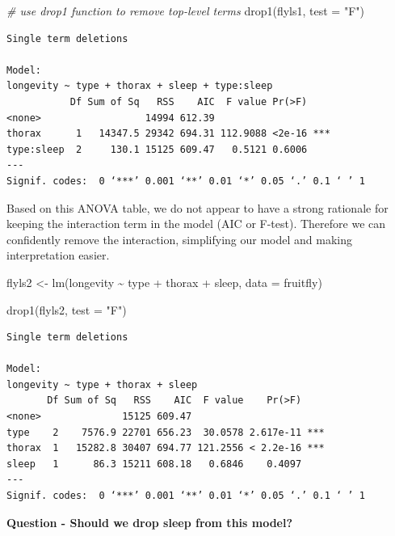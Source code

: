 \documentclass[
]{book}
\newenvironment{Shaded}{\begin{snugshade}}{\end{snugshade}}
\newcommand{\AttributeTok}[1]{\textcolor[rgb]{0.77,0.63,0.00}{#1}}
\newcommand{\CommentTok}[1]{\textcolor[rgb]{0.56,0.35,0.01}{\textit{#1}}}
\newcommand{\FunctionTok}[1]{\textcolor[rgb]{0.00,0.00,0.00}{#1}}
\newcommand{\NormalTok}[1]{#1}
\newcommand{\OtherTok}[1]{\textcolor[rgb]{0.56,0.35,0.01}{#1}}
\newcommand{\SpecialCharTok}[1]{\textcolor[rgb]{0.00,0.00,0.00}{#1}}
\newcommand{\StringTok}[1]{\textcolor[rgb]{0.31,0.60,0.02}{#1}}
\begin{document}
\begin{Shaded}
\begin{Highlighting}[]
\CommentTok{\# use drop1 function to remove top{-}level terms}
\FunctionTok{drop1}\NormalTok{(flyls1, }\AttributeTok{test =} \StringTok{"F"}\NormalTok{)}
\end{Highlighting}
\end{Shaded}

\begin{verbatim}
Single term deletions

Model:
longevity ~ type + thorax + sleep + type:sleep
           Df Sum of Sq   RSS    AIC  F value Pr(>F)    
<none>                  14994 612.39                    
thorax      1   14347.5 29342 694.31 112.9088 <2e-16 ***
type:sleep  2     130.1 15125 609.47   0.5121 0.6006    
---
Signif. codes:  0 ‘***’ 0.001 ‘**’ 0.01 ‘*’ 0.05 ‘.’ 0.1 ‘ ’ 1
\end{verbatim}

Based on this ANOVA table, we do not appear to have a strong rationale for keeping the interaction term in the model (AIC or F-test). Therefore we can confidently remove the interaction, simplifying our model and making interpretation easier.

\begin{Shaded}
\begin{Highlighting}[]
\NormalTok{flyls2 }\OtherTok{\textless{}{-}} \FunctionTok{lm}\NormalTok{(longevity }\SpecialCharTok{\textasciitilde{}}\NormalTok{ type }\SpecialCharTok{+}\NormalTok{ thorax }\SpecialCharTok{+}\NormalTok{ sleep, }\AttributeTok{data =}\NormalTok{ fruitfly)}

\FunctionTok{drop1}\NormalTok{(flyls2, }\AttributeTok{test =} \StringTok{"F"}\NormalTok{)}
\end{Highlighting}
\end{Shaded}

\begin{verbatim}
Single term deletions

Model:
longevity ~ type + thorax + sleep
       Df Sum of Sq   RSS    AIC  F value    Pr(>F)    
<none>              15125 609.47                       
type    2    7576.9 22701 656.23  30.0578 2.617e-11 ***
thorax  1   15282.8 30407 694.77 121.2556 < 2.2e-16 ***
sleep   1      86.3 15211 608.18   0.6846    0.4097    
---
Signif. codes:  0 ‘***’ 0.001 ‘**’ 0.01 ‘*’ 0.05 ‘.’ 0.1 ‘ ’ 1
\end{verbatim}

\textbf{Question - Should we drop sleep from this model?}
\end{document}
